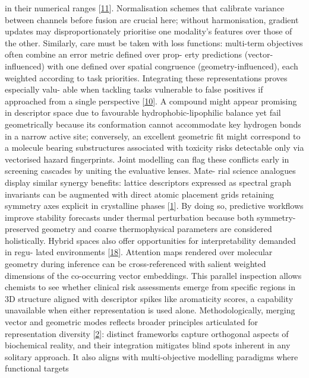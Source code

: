 \documentclass[
]{article}
\begin{document}
in their numerical ranges {[}\protect\hyperlink{_bookmark51}{11}{]}.
Normalisation schemes that calibrate variance between channels before
fusion are crucial here; without harmonisation, gradient updates may
disproportionately prioritise one modality's features over those of the
other. Similarly, care must be taken with loss functions: multi-term
objectives often combine an error metric defined over prop- erty
predictions (vector-influenced) with one defined over spatial congruence
(geometry-influenced), each weighted according to task priorities.
Integrating these representations proves especially valu- able when
tackling tasks vulnerable to false positives if approached from a single
perspective {[}\protect\hyperlink{_bookmark50}{10}{]}. A compound might
appear promising in descriptor space due to favourable
hydrophobic-lipophilic balance yet fail geometrically because its
conformation cannot accommodate key hydrogen bonds in a narrow active
site; conversely, an excellent geometric fit might correspond to a
molecule bearing substructures associated with toxicity risks detectable
only via vectorised hazard fingerprints. Joint modelling can flag these
conflicts early in screening cascades by uniting the evaluative lenses.
Mate- rial science analogues display similar synergy benefits: lattice
descriptors expressed as spectral graph invariants can be augmented with
direct atomic placement grids retaining symmetry axes explicit in
crystalline phases {[}\protect\hyperlink{_bookmark41}{1}{]}. By doing
so, predictive workflows improve stability forecasts under thermal
perturbation because both symmetry-preserved geometry and coarse
thermophysical parameters are considered holistically. Hybrid spaces
also offer opportunities for interpretability demanded in regu- lated
environments {[}\protect\hyperlink{_bookmark58}{18}{]}. Attention maps
rendered over molecular geometry during inference can be
cross-referenced with salient weighted dimensions of the co-occurring
vector embeddings. This parallel inspection allows chemists to see
whether clinical risk assessments emerge from specific regions in 3D
structure aligned with descriptor spikes like aromaticity scores, a
capability unavailable when either representation is used alone.
Methodologically, merging vector and geometric modes reflects broader
principles articulated for representation diversity
{[}\protect\hyperlink{_bookmark42}{2}{]}: distinct frameworks capture
orthogonal aspects of biochemical reality, and their integration
mitigates blind spots inherent in any solitary approach. It also aligns
with multi-objective modelling paradigms where functional targets
\end{document}
